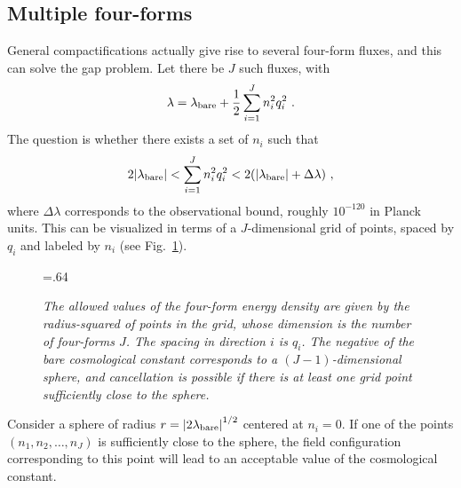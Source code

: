 \documentclass[12pt]{article}
\begin{document}
\subsection{Multiple four-forms}

General compactifications actually give rise to several four-form fluxes,
and this can solve the gap problem.  Let there be $J$ such fluxes, with
\begin{equation}
\lambda = \lambda_{\rm bare} + \frac{1}{2} \sum_{i=1}^{J}
n_i^2 q_i^2 \label{eq-grid}\ .
\end{equation}
The question is whether there exists a set of $n_i$ such
that
\begin{equation}
2 |\lambda_{\rm bare}| <
\sum_{i=1}^{J} {n_i^2 q_i^2 } <
2(|\lambda_{\rm bare}| + \Delta\lambda)\ ,
\end{equation}
where $\Delta\lambda$ corresponds to the observational bound, roughly
$10^{-120}$ in Planck units.
This can be visualized in terms of a
$J$-dimensional grid of points, spaced by $q_i$ and labeled by $n_i$
(see Fig.~\ref{fig-grid}).
\begin{figure}[htb!]
  \hspace{.18\textwidth} \vbox{\epsfxsize=.64\textwidth
}
  \caption[]%
%
  {\small\sl The allowed values of the four-form energy density are
  given by the radius-squared of points in the grid, whose dimension
  is the number of four-forms $J$.  The spacing in direction $i$ is
  $q_i$.  The negative of the bare cosmological constant corresponds
  to a $(J-1)$-dimensional sphere, and cancellation is possible if
  there is at least one grid point sufficiently close to the sphere.}
%
  \label{fig-grid}
\end{figure}
Consider a sphere of radius $r={|2 \lambda_{\rm bare}|}^{1/2}$
centered at $n_i=0$.  If one of the points $(n_1, n_2, \ldots, n_J)$
is sufficiently close to the sphere, the field configuration
corresponding to this point will lead to an acceptable value of the
cosmological constant.
\end{document}
